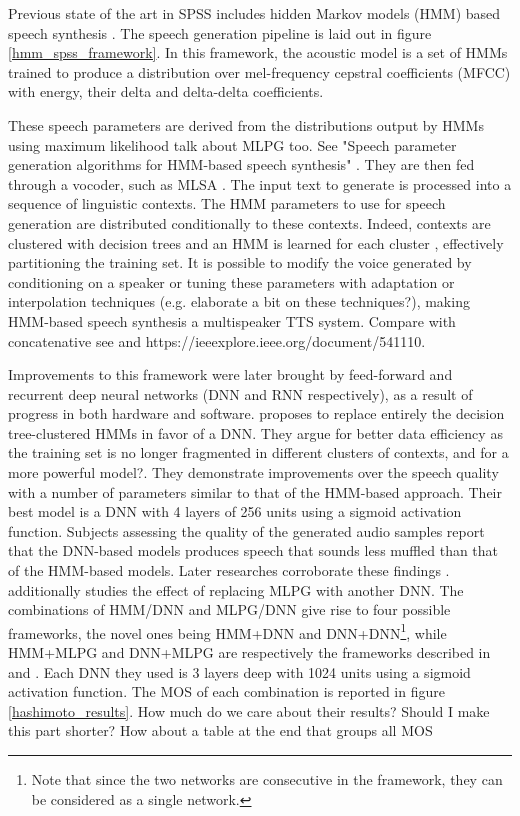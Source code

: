 \documentclass[a4paper, oneside]{article}
\begin{document}
Previous state of the art in SPSS includes hidden Markov models (HMM) based speech synthesis \cite{Tokuda-2013}. The speech generation pipeline is laid out in figure \ref{hmm_spss_framework}. In this framework, the acoustic model is a set of HMMs trained to produce a distribution over mel-frequency cepstral coefficients (MFCC) with energy, their delta and delta-delta coefficients.

These speech parameters are derived from the distributions output by HMMs using maximum likelihood  \color{red} talk about MLPG too. See "Speech parameter generation algorithms for HMM-based speech synthesis" \color{black}. They are then fed through a vocoder, such as MLSA \cite{MLSA}. The input text to generate is processed into a sequence of linguistic contexts. The HMM parameters to use for speech generation are distributed conditionally to these contexts. Indeed, contexts are clustered with decision trees and an HMM is learned for each cluster \cite{HMMTTS}, effectively partitioning the training set. It is possible to modify the voice generated by conditioning on a speaker or tuning these parameters with adaptation or interpolation techniques (e.g. \cite{HMMSpeakerInterpolation}  \color{red} elaborate a bit on these techniques?\color{black}), making HMM-based speech synthesis a multispeaker TTS system. \color{red} Compare with concatenative see \cite{SPSSDNN} and https://ieeexplore.ieee.org/document/541110.\color{black}

Improvements to this framework were later brought by feed-forward and recurrent deep neural networks (DNN and RNN respectively), as a result of progress in both hardware and software. \cite{SPSSDNN} proposes to replace entirely the decision tree-clustered HMMs in favor of a DNN. They argue for better data efficiency as the training set is no longer fragmented in different clusters of contexts\color{red}, and for a more powerful model?\color{black}. They demonstrate improvements over the speech quality with a number of parameters similar to that of the HMM-based approach. Their best model is a DNN with 4 layers of 256 units using a sigmoid activation function. Subjects assessing the quality of the generated audio samples report that the DNN-based models produces speech that sounds less muffled than that of the HMM-based models. Later researches corroborate these findings \cite{OnTheTrainingAspects}. \cite{Hashimoto-2015} additionally studies the effect of replacing MLPG with another DNN. The combinations of HMM/DNN and MLPG/DNN give rise to four possible frameworks, the novel ones being HMM+DNN and DNN+DNN\footnote{Note that since the two networks are consecutive in the framework, they can be considered as a single network.}, while HMM+MLPG and DNN+MLPG are respectively the frameworks described in \cite{Tokuda-2013} and \cite{SPSSDNN}. Each DNN they used is 3 layers deep with 1024 units using a sigmoid activation function. The MOS of each combination is reported in figure \ref{hashimoto_results}. \color{red} How much do we care about their results? Should I make this part shorter? How about a table at the end that groups all MOS \color{black}
\end{document}
